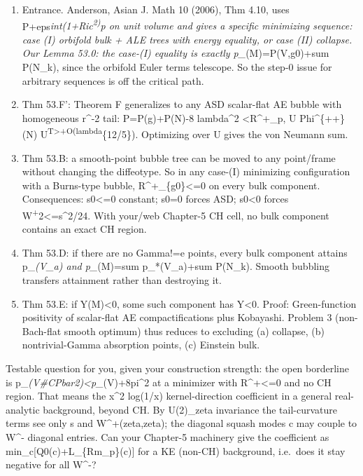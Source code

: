 \documentclass[
  10pt,
]{report}
\begin{document}
\begin{enumerate}
\def\labelenumi{(\arabic{enumi})}
\item
  Entrance. Anderson, Asian J. Math 10 (2006), Thm 4.10, uses
  P+eps\emph{int(1+\textbar Ric\textbar{}\textsuperscript{2)}p on unit
  volume and gives a specific minimizing sequence: case (I) orbifold
  bulk + ALE trees with energy equality, or case (II) collapse. Our
  Lemma 53.0: the case-(I) equality is exactly p\_}(M)=P(V,g0)+sum
  P(N\_k), since the orbifold Euler terms telescope. So the step-0 issue
  for arbitrary sequences is off the critical path.
\item
  Thm 53.F': Theorem F generalizes to any ASD scalar-flat AE bubble with
  homogeneous r\^{}-2 tail: P=P(g)+P(N)-8 lambda\^{}2
  \textless R\^{}+\_p, U Phi\^{}\{++\}(N)
  U\textsuperscript{T\textgreater+O(lambda}\{12/5\}). Optimizing over U
  gives the von Neumann sum.
\item
  Thm 53.B: a smooth-point bubble tree can be moved to any point/frame
  without changing the diffeotype. So in any case-(I) minimizing
  configuration with a Burns-type bubble, R\^{}+\_\{g0\}\textless=0 on
  every bulk component. Consequences: s0\textless=0 constant; s0=0
  forces ASD; s0\textless0 forces
  \textbar W\textsuperscript{+\textbar{}}2\textless=s\^{}2/24. With
  your/web Chapter-5 CH cell, no bulk component contains an exact CH
  region.
\item
  Thm 53.D: if there are no Gamma!=e points, every bulk component
  attains p\_\emph{(V\_a) and p\_}(M)=sum p\_*(V\_a)+sum P(N\_k). Smooth
  bubbling transfers attainment rather than destroying it.
\item
  Thm 53.E: if Y(M)\textless0, some such component has Y\textless0.
  Proof: Green-function positivity of scalar-flat AE compactifications
  plus Kobayashi. Problem 3 (non-Bach-flat smooth optimum) thus reduces
  to excluding (a) collapse, (b) nontrivial-Gamma absorption points, (c)
  Einstein bulk.
\end{enumerate}

Testable question for you, given your construction strength: the open
borderline is p\_\emph{(V\#CPbar2)\textless p\_}(V)+8pi\^{}2 at a
minimizer with R\^{}+\textless=0 and no CH region. That means the x\^{}2
log(1/x) kernel-direction coefficient in a general real-analytic
background, beyond CH. By U(2)\_zeta invariance the tail-curvature terms
see only s and W\^{}+(zeta,zeta); the diagonal squash modes c may couple
to W\^{}- diagonal entries. Can your Chapter-5 machinery give the
coefficient as min\_c{[}Q0(c)+L\_\{Rm\_p\}(c){]} for a KE (non-CH)
background, i.e.~does it stay negative for all W\^{}-?
\end{document}
